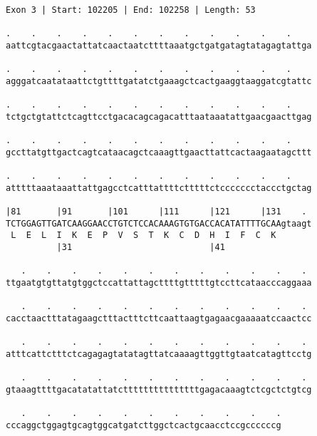 \documentclass{article}
\begin{document}
\newpage
\begin{Verbatim}[fontfamily=courier]
Exon 3 | Start: 102205 | End: 102258 | Length: 53

.    .    .    .    .    .    .    .    .    .    .    .    
aattcgtacgaactattatcaactaatcttttaaatgctgatgatagtatagagtattga

.    .    .    .    .    .    .    .    .    .    .    .    
agggatcaatataattctgttttgatatctgaaagctcactgaaggtaaggatcgtattc

.    .    .    .    .    .    .    .    .    .    .    .    
tctgctgtattctcagttcctgacacagcagacatttaataaatattgaacgaacttgag

.    .    .    .    .    .    .    .    .    .    .    .    
gccttatgttgactcagtcataacagctcaaagttgaacttattcactaagaatagcttt

.    .    .    .    .    .    .    .    .    .    .    .    
atttttaaataaattattgagcctcatttattttctttttctccccccctaccctgctag

|81       |91       |101      |111      |121      |131    . 
TCTGGAGTTGATCAAGGAACCTGTCTCCACAAAGTGTGACCACATATTTTGCAAgtaagt
 L  E  L  I  K  E  P  V  S  T  K  C  D  H  I  F  C  K       
          |31                           |41                 

   .    .    .    .    .    .    .    .    .    .    .    . 
ttgaatgtgttatgtggctccattattagcttttgtttttgtccttcataacccaggaaa

   .    .    .    .    .    .    .    .    .    .    .    . 
cacctaactttatagaagctttactttcttcaattaagtgagaacgaaaaatccaactcc

   .    .    .    .    .    .    .    .    .    .    .    . 
atttcattctttctcagagagtatatagttatcaaaagttggttgtaatcatagttcctg

   .    .    .    .    .    .    .    .    .    .    .    . 
gtaaagttttgacatatattatctttttttttttttttgagacaaagtctcgctctgtcg

   .    .    .    .    .    .    .    .    .    .    .
cccaggctggagtgcagtggcatgatcttggctcactgcaacctccgccccccg
\end{Verbatim}
\newpage
\end{document}
